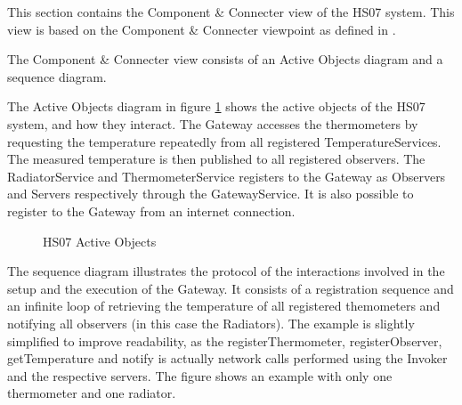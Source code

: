 \documentclass[a4paper,10pt]{article}
\begin{document}
This section contains the Component \& Connecter view of the HS07 system.
This view is based on the Component \& Connecter viewpoint as defined in
\cite{christensen2004archdesc}.

The Component \& Connecter view consists of an Active Objects diagram and a
sequence diagram.

The Active Objects diagram in figure \ref{fig:cc_ao} shows the active objects
of the HS07 system, and how they interact. The Gateway accesses the thermometers
by requesting the temperature repeatedly from all registered TemperatureServices.
The measured temperature is then published to all registered observers. The
RadiatorService and ThermometerService registers to the Gateway as Observers and
Servers respectively through the GatewayService. It is also possible to register
to the Gateway from an internet connection.

\begin{figure}[!htb]
\caption{HS07 Active Objects}
\label{fig:cc_ao}
\end{figure}

The sequence diagram illustrates the protocol of the interactions involved in the 
setup and the execution of the Gateway. It consists of a registration sequence and 
an infinite loop of retrieving the temperature of all registered themometers and 
notifying all observers (in this case the Radiators). The example is slightly 
simplified to improve readability, as the registerThermometer, registerObserver, 
getTemperature and notify is actually network calls performed using the Invoker and 
the respective servers. The figure shows an example with only one thermometer and
one radiator.

\clearpage
\end{document}
